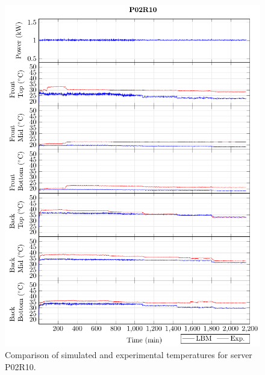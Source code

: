 \documentclass[border=10pt,preview]{standalone}
\begin{document}
\begin{figure}[!htb]
\centering
\includegraphics[width=\linewidth]{Plots/P02R10_T.pdf}
\caption{Comparison of simulated and experimental temperatures for server P02R10.}
\label{fig:P02R10_plot}
\end{figure}
\end{document}
